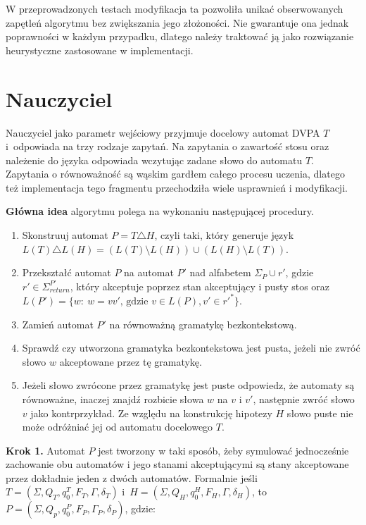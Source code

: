 W przeprowadzonych testach modyfikacja ta pozwoliła unikać obserwowanych zapętleń algorytmu bez zwiększania jego złożoności.
Nie gwarantuje ona jednak poprawności w każdym przypadku, dlatego należy traktować ją jako rozwiązanie heurystyczne zastosowane w implementacji.

\section{Nauczyciel}

Nauczyciel jako parametr wejściowy przyjmuje docelowy automat DVPA $T$ i~odpowiada na trzy rodzaje zapytań. Na zapytania o zawartość stosu
oraz należenie do języka odpowiada wczytując zadane słowo do automatu $T$. Zapytania o równoważność są wąskim gardłem całego
procesu uczenia, dlatego też implementacja tego fragmentu przechodziła wiele usprawnień i modyfikacji.

\textbf{Główna idea} algorytmu polega na wykonaniu następującej procedury.

\begin{enumerate}
    \item Skonstruuj automat $P = T \triangle H$, czyli taki, który generuje język $L(T) \triangle L(H) = (L(T) \setminus L(H)) \cup (L(H) \setminus L(T))$.

    \item Przekształć automat $P$ na automat $P'$ nad alfabetem $\Sigma_P \cup {r'}$, gdzie $r' \in \Sigma_{return}^{P'}$,
        który akceptuje poprzez stan akceptujący i pusty stos oraz $L(P') = \{w : \ w = vv' \text{, gdzie } v \in L(P), v' \in {r'}^* \}$.

    \item Zamień automat $P'$ na równoważną gramatykę bezkontekstową.

    \item Sprawdź czy utworzona gramatyka bezkontekstowa jest pusta, jeżeli nie zwróć słowo $w$ akceptowane przez tę gramatykę.

    \item Jeżeli słowo zwrócone przez gramatykę jest puste odpowiedz, że automaty są równoważne, inaczej znajdź
            rozbicie słowa $w$ na $v$ i $v'$, następnie zwróć słowo $v$ jako kontrprzykład.
            Ze względu na konstrukcję hipotezy $H$ słowo puste nie może odróżniać jej od automatu docelowego $T$.
\end{enumerate}

\textbf{Krok 1.} Automat $P$ jest tworzony w taki sposób, żeby symulować jednocześnie zachowanie obu automatów i jego stanami akceptującymi są stany
akceptowane przez dokładnie jeden z dwóch automatów. Formalnie jeśli $T = (\Sigma, Q_T, q_0^T, F_T, \Gamma, \delta_T)$
i~$H = (\Sigma, Q_H, q_0^H, F_H, \Gamma, \delta_H)$, to $P = (\Sigma, Q_p, q_0^P, F_P, \Gamma_P, \delta_P)$, gdzie:

